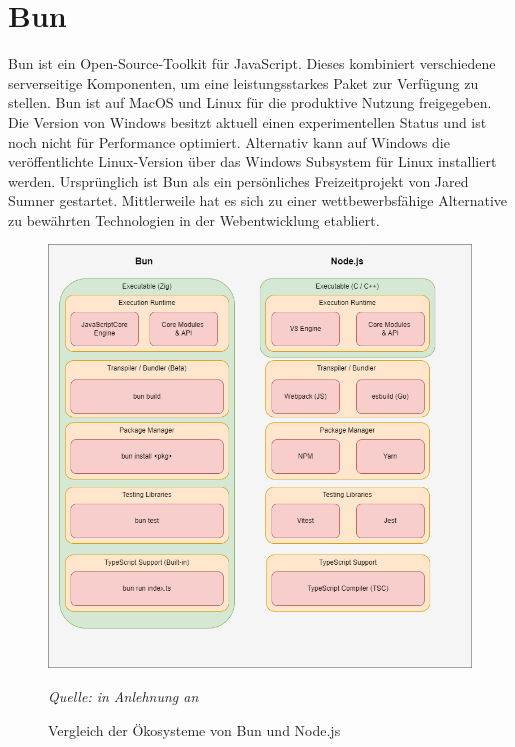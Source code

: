 \section{Bun} \label{sec:foundations-Bun}
Bun ist ein Open-Source-Toolkit für JavaScript. Dieses kombiniert verschiedene serverseitige Komponenten, um eine leistungsstarkes Paket zur Verfügung zu stellen. Bun ist auf MacOS und Linux für die produktive Nutzung freigegeben. Die Version von Windows besitzt aktuell einen experimentellen Status und ist noch nicht für Performance optimiert. Alternativ kann auf Windows die veröffentlichte Linux-Version über das Windows Subsystem für Linux installiert werden. Ursprünglich ist Bun als ein persönliches Freizeitprojekt von Jared Sumner gestartet. Mittlerweile hat es sich zu einer wettbewerbsfähige Alternative zu bewährten Technologien in der Webentwicklung etabliert.\cite{Sumner.2023c, Tyson.2023}\\

\begin{figure}[h]
	\centering
	\includegraphics[width=\linewidth]{./images/EcosystemBunvsNode.png}
	\caption{Vergleich der Ökosysteme von Bun und Node.js}
	\label{fig:ecosystemComparison}
	\textit{Quelle: in Anlehnung an \cite{Springer.2022, OvenSh.2023c}}
\end{figure}

